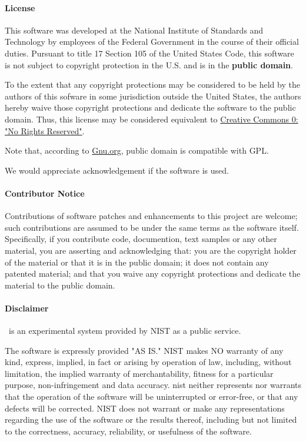 \documentclass{article}
\begin{document}
\paragraph{License}
  This software was developed at the National Institute of Standards and
Technology by employees of the Federal Government in the course of their
official duties. Pursuant to title 17 Section 105 of the United States
Code, this software is not subject to copyright protection in the U.S.
and is in the \textbf{public domain}.

To the extent that any copyright protections may be considered to be held
by the authors of this sofware in some jurisdiction outside the United
States, the authors hereby waive those copyright protections and dedicate
the software to the public domain. Thus, this license may be considered equivalent to
\href{http://creativecommons.org/about/cc0}{Creative Commons 0: "No Rights Reserved"}.

Note that, according to
\href{http://www.gnu.org/licences/license-list.html#PublicDomain}{Gnu.org},
public domain is compatible with GPL.

We would appreciate acknowledgement if the software is used.

\paragraph{Contributor Notice}
  Contributions of software patches and enhancements to this project
are welcome; such contributions are assumed to be under the same terms
as the software itself.  Specifically, if you contribute code, documention,
text samples or any other material, you are asserting and acknowledging that:
you are the copyright holder of the material or that it is in the public domain;
it does not contain any patented material; and that you waive any copyright
protections and dedicate the material to the public domain.

\paragraph{Disclaimer}
  \LaTeXML\ is an experimental system provided by NIST as a public service.

The software is expressly provided "AS IS." NIST makes NO warranty of
any kind, express, implied, in fact or arising by operation of law,
including, without limitation, the implied warranty of
merchantability, fitness for a particular purpose, non-infringement
and data accuracy. nist neither represents nor warrants that the
operation of the software will be uninterrupted or error-free, or that
any defects will be corrected. NIST does not warrant or make any
representations regarding the use of the software or the results
thereof, including but not limited to the correctness, accuracy,
reliability, or usefulness of the software.
\end{document}
